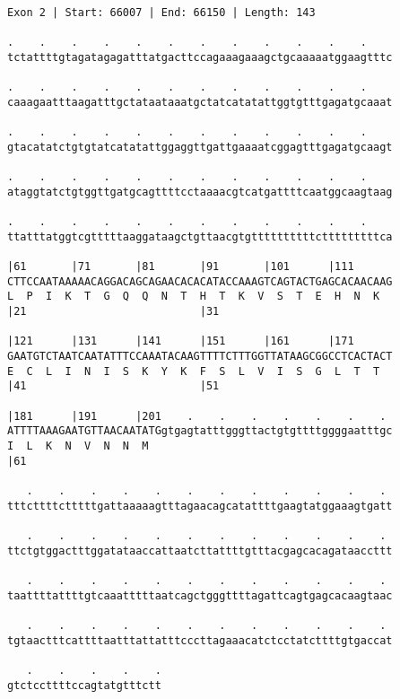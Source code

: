\documentclass{article}
\begin{document}
\begin{Verbatim}
Exon 2 | Start: 66007 | End: 66150 | Length: 143
 
.    .    .    .    .    .    .    .    .    .    .    .    
tctattttgtagatagagatttatgacttccagaaagaaagctgcaaaaatggaagtttc
  
.    .    .    .    .    .    .    .    .    .    .    .    
caaagaatttaagatttgctataataaatgctatcatatattggtgtttgagatgcaaat
  
.    .    .    .    .    .    .    .    .    .    .    .    
gtacatatctgtgtatcatatattggaggttgattgaaaatcggagtttgagatgcaagt
  
.    .    .    .    .    .    .    .    .    .    .    .    
ataggtatctgtggttgatgcagttttcctaaaacgtcatgattttcaatggcaagtaag
  
.    .    .    .    .    .    .    .    .    .    .    .    
ttatttatggtcgtttttaaggataagctgttaacgtgttttttttttctttttttttca
  
|61       |71       |81       |91       |101      |111      
CTTCCAATAAAAACAGGACAGCAGAACACACATACCAAAGTCAGTACTGAGCACAACAAG
L  P  I  K  T  G  Q  Q  N  T  H  T  K  V  S  T  E  H  N  K  
|21                           |31                           
  
|121      |131      |141      |151      |161      |171      
GAATGTCTAATCAATATTTCCAAATACAAGTTTTCTTTGGTTATAAGCGGCCTCACTACT
E  C  L  I  N  I  S  K  Y  K  F  S  L  V  I  S  G  L  T  T  
|41                           |51                           
  
|181      |191      |201    .    .    .    .    .    .    . 
ATTTTAAAGAATGTTAACAATATGgtgagtatttgggttactgtgttttggggaatttgc
I  L  K  N  V  N  N  M                                      
|61                                                         
  
   .    .    .    .    .    .    .    .    .    .    .    . 
tttcttttctttttgattaaaaagtttagaacagcatattttgaagtatggaaagtgatt
  
   .    .    .    .    .    .    .    .    .    .    .    . 
ttctgtggactttggatataaccattaatcttattttgtttacgagcacagataaccttt
  
   .    .    .    .    .    .    .    .    .    .    .    . 
taattttattttgtcaaatttttaatcagctgggttttagattcagtgagcacaagtaac
  
   .    .    .    .    .    .    .    .    .    .    .    . 
tgtaactttcattttaatttattatttcccttagaaacatctcctatcttttgtgaccat
  
   .    .    .    .    .
gtctccttttccagtatgtttctt
\end{Verbatim}
\newpage
\end{document}
